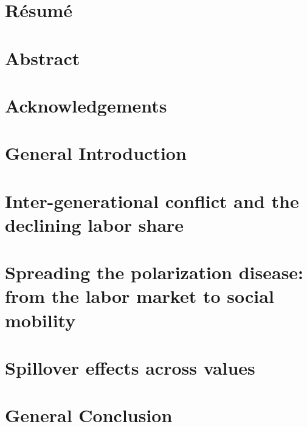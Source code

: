 \documentclass{amse_these}
\begin{document}
	\chead{}
	\thispagestyle{empty}
	
	\newpage
	\thispagestyle{empty}
	

	\chapter*{Résumé}					%
	

	\chapter*{Abstract}					%
	

	\chapter*{Acknowledgements}			%
	
	
    	\tableofcontents				%
    	\listoffigures					%
    	\listoftables					%

	\chapter*{General Introduction}
	
    \clearpage
	\ohead{\leftmark\ifstr{\rightmark}{\leftmark}{}{ -- \rightmark}} %

	\chapter{Inter-generational conflict and the declining labor share}\label{chap1}
	

	\chapter{Spreading the polarization disease: from the labor market to social mobility}\label{chap2}
	

	\chapter{Spillover effects across values}\label{chap3}
	

	\chapter*{General Conclusion}
	
\end{document}
